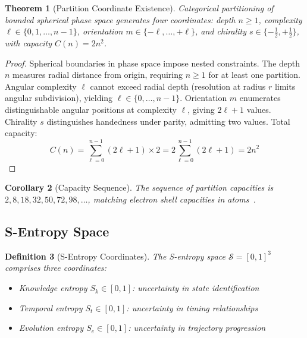 \documentclass[aps,prd,twocolumn,superscriptaddress,floatfix,nofootinbib]{revtex4-2}
\newtheorem{theorem}{Theorem}[section]
\newtheorem{corollary}[theorem]{Corollary}
\newtheorem{definition}[theorem]{Definition}
\theoremstyle{remark}
\newcommand{\Sk}{S_k}
\newcommand{\St}{S_t}
\newcommand{\Se}{S_e}
\newcommand{\Sspace}{\mathcal{S}}
\begin{document}
\begin{theorem}[Partition Coordinate Existence]
\label{thm:partition_coords}
Categorical partitioning of bounded spherical phase space generates four coordinates: depth $n \geq 1$, complexity $\ell \in \{0, 1, \ldots, n-1\}$, orientation $m \in \{-\ell, \ldots, +\ell\}$, and chirality $s \in \{-\frac{1}{2}, +\frac{1}{2}\}$, with capacity $C(n) = 2n^2$.
\end{theorem}

\begin{proof}
Spherical boundaries in phase space impose nested constraints. The depth $n$ measures radial distance from origin, requiring $n \geq 1$ for at least one partition. Angular complexity $\ell$ cannot exceed radial depth (resolution at radius $r$ limits angular subdivision), yielding $\ell \in \{0, \ldots, n-1\}$. Orientation $m$ enumerates distinguishable angular positions at complexity $\ell$, giving $2\ell + 1$ values. Chirality $s$ distinguishes handedness under parity, admitting two values. Total capacity:
\begin{equation}
C(n) = \sum_{\ell=0}^{n-1}(2\ell + 1) \times 2 = 2 \sum_{\ell=0}^{n-1}(2\ell + 1) = 2n^2
\end{equation}
\end{proof}

\begin{corollary}[Capacity Sequence]
\label{cor:capacity}
The sequence of partition capacities is $2, 8, 18, 32, 50, 72, 98, \ldots$, matching electron shell capacities in atoms~\cite{pauli1925,aufbau}.
\end{corollary}

\subsection{S-Entropy Space}

\begin{definition}[S-Entropy Coordinates]
\label{def:s_entropy}
The S-entropy space $\Sspace = [0,1]^3$ comprises three coordinates:
\begin{itemize}
\item Knowledge entropy $\Sk \in [0,1]$: uncertainty in state identification
\item Temporal entropy $\St \in [0,1]$: uncertainty in timing relationships
\item Evolution entropy $\Se \in [0,1]$: uncertainty in trajectory progression
\end{itemize}
\end{definition}
\end{document}

